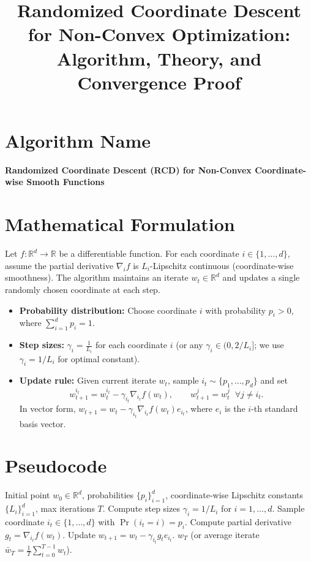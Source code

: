 \documentclass{article}
\newcommand{\R}{\mathbb{R}}
\begin{document}
\title{Randomized Coordinate Descent for Non-Convex Optimization: Algorithm, Theory, and Convergence Proof}
\author{}
\date{}
\maketitle

\section*{Algorithm Name}
\textbf{Randomized Coordinate Descent (RCD) for Non-Convex Coordinate-wise Smooth Functions}

\section*{Mathematical Formulation}

Let $f: \R^d \to \R$ be a differentiable function. For each coordinate $i \in \{1,\dots,d\}$, assume the partial derivative $\nabla_i f$ is $L_i$-Lipschitz continuous (coordinate-wise smoothness). The algorithm maintains an iterate $w_t \in \R^d$ and updates a single randomly chosen coordinate at each step.

\begin{itemize}
    \item \textbf{Probability distribution:} Choose coordinate $i$ with probability $p_i > 0$, where $\sum_{i=1}^d p_i = 1$.
    \item \textbf{Step sizes:} $\gamma_i = \frac{1}{L_i}$ for each coordinate $i$ (or any $\gamma_i \in (0, 2/L_i]$; we use $\gamma_i = 1/L_i$ for optimal constant).
    \item \textbf{Update rule:} Given current iterate $w_t$, sample $i_t \sim \{p_1,\dots,p_d\}$ and set
    \begin{equation}
        w_{t+1}^{i_t} = w_t^{i_t} - \gamma_{i_t} \nabla_{i_t} f(w_t), \qquad
        w_{t+1}^j = w_t^j \;\; \forall j \neq i_t.
    \end{equation}
    In vector form, $w_{t+1} = w_t - \gamma_{i_t} \nabla_{i_t} f(w_t) e_{i_t}$, where $e_i$ is the $i$-th standard basis vector.
\end{itemize}

\section*{Pseudocode}

\begin{algorithm}
\caption{Randomized Coordinate Descent (RCD)}
\begin{algorithmic}
\REQUIRE Initial point $w_0 \in \R^d$, probabilities $\{p_i\}_{i=1}^d$, coordinate-wise Lipschitz constants $\{L_i\}_{i=1}^d$, max iterations $T$.
\STATE Compute step sizes $\gamma_i = 1/L_i$ for $i=1,\dots,d$.
    \STATE Sample coordinate $i_t \in \{1,\dots,d\}$ with $\Pr(i_t = i) = p_i$.
    \STATE Compute partial derivative $g_t = \nabla_{i_t} f(w_t)$.
    \STATE Update $w_{t+1} = w_t - \gamma_{i_t} g_t e_{i_t}$.
\ENDFOR
\RETURN $w_T$ (or average iterate $\bar{w}_T = \frac{1}{T}\sum_{t=0}^{T-1} w_t$).
\end{algorithmic}
\end{algorithm}
\end{document}
